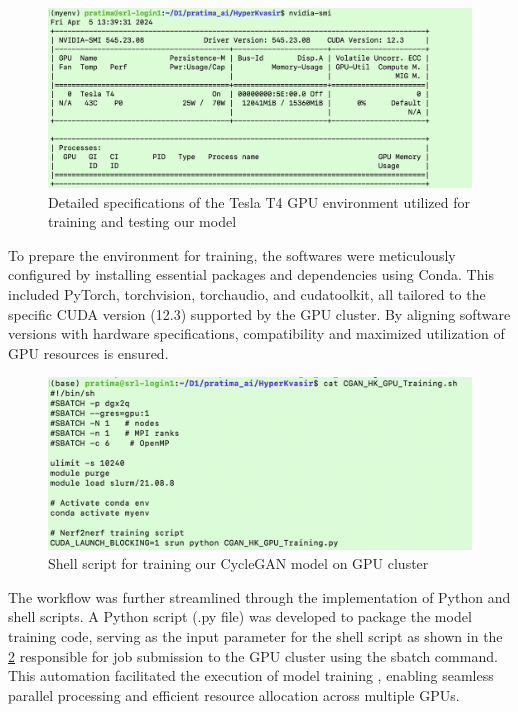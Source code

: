 \documentclass[UKenglish,12pt]{master-style}
\begin{document}
\begin{figure}[htbp]
    \centering
    \includegraphics[width=1\textwidth]{Images/GPU.png}
    \caption{Detailed specifications of the Tesla T4 GPU environment utilized for training and testing our model}
    \label{fig:GPU}
\end{figure}

To prepare the environment for training, the softwares were meticulously configured by installing essential packages and dependencies using Conda. This included PyTorch, torchvision, torchaudio, and cudatoolkit, all tailored to the specific CUDA version (12.3) supported by the GPU cluster. By aligning software versions with hardware specifications, compatibility and maximized utilization of GPU resources is ensured.

\begin{figure}[htbp]
    \centering
    \includegraphics[width=1\textwidth]{Images/sbatch.png}
    \caption{Shell script for training our CycleGAN model on GPU cluster}
    \label{fig:sbatch}
\end{figure}

The workflow was further streamlined through the implementation of Python and shell scripts. A Python script (.py file) was developed to package the model training code, serving as the input parameter for the shell script as shown in the \ref{fig:sbatch} responsible for job submission to the GPU cluster using the sbatch command. This automation facilitated the execution of model training , enabling seamless parallel processing and efficient resource allocation across multiple GPUs.
\end{document}
